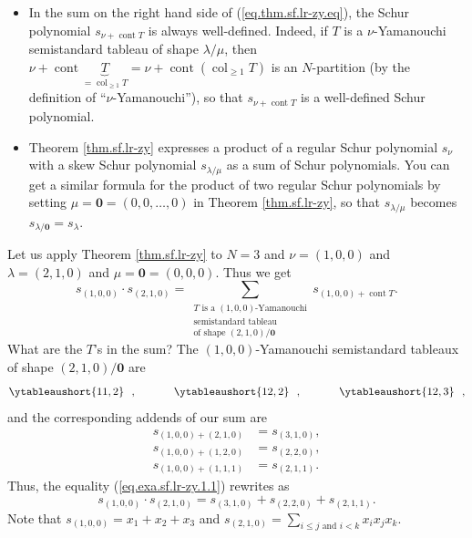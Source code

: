 \begin{itemize}
\item In the sum on the right hand side of (\ref{eq.thm.sf.lr-zy.eq}), the
Schur polynomial $s_{\nu+\operatorname*{cont}T}$ is always well-defined.
Indeed, if $T$ is a $\nu$-Yamanouchi semistandard tableau of shape
$\lambda/\mu$, then $\nu+\operatorname*{cont}\underbrace{T}%
_{=\operatorname{col}_{\geq1}T}=\nu+\operatorname*{cont}\left(
\operatorname{col}_{\geq1}T\right)  $ is an $N$-partition (by the definition
of \textquotedblleft$\nu$-Yamanouchi\textquotedblright), so that
$s_{\nu+\operatorname*{cont}T}$ is a well-defined Schur polynomial.

\item Theorem \ref{thm.sf.lr-zy} expresses a product of a regular Schur
polynomial $s_{\nu}$ with a skew Schur polynomial $s_{\lambda/\mu}$ as a sum
of Schur polynomials. You can get a similar formula for the product of two
regular Schur polynomials by setting $\mu=\mathbf{0}=\left(  0,0,\ldots
,0\right)  $ in Theorem \ref{thm.sf.lr-zy}, so that $s_{\lambda/\mu}$ becomes
$s_{\lambda/\mathbf{0}}=s_{\lambda}$.
\end{itemize}

\begin{example}
\label{exa.sf.lr-zy.1}Let us apply Theorem \ref{thm.sf.lr-zy} to $N=3$ and
$\nu=\left(  1,0,0\right)  $ and $\lambda=\left(  2,1,0\right)  $ and
$\mu=\mathbf{0}=\left(  0,0,0\right)  $. Thus we get%
\begin{equation}
s_{\left(  1,0,0\right)  }\cdot s_{\left(  2,1,0\right)  }=\sum
_{\substack{T\text{ is a }\left(  1,0,0\right)  \text{-Yamanouchi}%
\\\text{semistandard tableau}\\\text{of shape }\left(  2,1,0\right)
/\mathbf{0}}}s_{\left(  1,0,0\right)  +\operatorname*{cont}T}.
\label{eq.exa.sf.lr-zy.1.1}%
\end{equation}
What are the $T$'s in the sum? The $\left(  1,0,0\right)  $-Yamanouchi
semistandard tableaux of shape $\left(  2,1,0\right)  /\mathbf{0}$ are
\[
\ytableaushort{11,2}\ \ ,\ \ \ \ \ \ \ \ \ \ \ytableaushort{12,2}\ \ ,\ \ \ \ \ \ \ \ \ \ \ytableaushort{12,3}\ \ ,
\]
and the corresponding addends of our sum are%
\begin{align*}
s_{\left(  1,0,0\right)  +\left(  2,1,0\right)  }  &  =s_{\left(
3,1,0\right)  },\\
s_{\left(  1,0,0\right)  +\left(  1,2,0\right)  }  &  =s_{\left(
2,2,0\right)  },\\
s_{\left(  1,0,0\right)  +\left(  1,1,1\right)  }  &  =s_{\left(
2,1,1\right)  }.
\end{align*}
Thus, the equality (\ref{eq.exa.sf.lr-zy.1.1}) rewrites as%
\[
s_{\left(  1,0,0\right)  }\cdot s_{\left(  2,1,0\right)  }=s_{\left(
3,1,0\right)  }+s_{\left(  2,2,0\right)  }+s_{\left(  2,1,1\right)  }.
\]
Note that $s_{\left(  1,0,0\right)  }=x_{1}+x_{2}+x_{3}$ and $s_{\left(
2,1,0\right)  }=\sum_{i\leq j\text{ and }i<k}x_{i}x_{j}x_{k}$.
\end{example}

